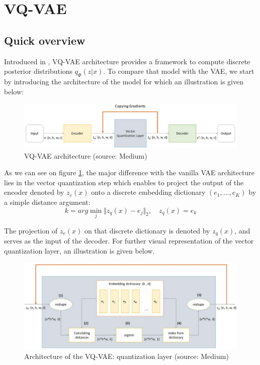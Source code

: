 \section{VQ-VAE}

\subsection{Quick overview}

Introduced in \cite{vq_vae_paper}, VQ-VAE architecture provides a framework to compute
discrete posterior distributions $q_{\Phi}(z|x)$.
To compare that model with the VAE, we start by introducing the architecture of the model for which an illustration is given below:

\begin{figure}[H]
    \centering
    \includegraphics[width=.9\textwidth]{images/vq_vae_architecture}
    \caption{VQ-VAE architecture (source: Medium)}
    \label{fig:vq_vae_architecture}
\end{figure}

As we can see on figure \ref{fig:vq_vae_architecture}, the major difference with the vanilla VAE architecture
lies in the vector quantization step which enables to project the output of the encoder denoted by $z_e(x)$
onto a discrete embedding dictionary $(e_1, \dots, e_K)$ by a simple distance argument:
$$
k = arg\min_{j} \Vert z_q(x) - e_j \Vert_2, \quad z_q(x) = e_k
$$

The projection of $z_e(x)$ on that discrete dictionary is denoted by $z_q(x)$, and serves as the input of the decoder.
For further visual representation of the vector quantization layer, an illustration is given below.

\begin{figure}[H]
    \centering
    \includegraphics[width=.7\textwidth]{images/vq_vae_quantization}
    \caption{Architecture of the VQ-VAE: quantization layer (source: Medium)}
    \label{fig:vq_vae_quantization}
\end{figure}

